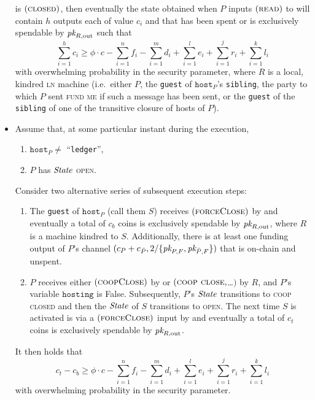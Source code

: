 \begin{lemma}
\begin{itemize}
    is $(\textsc{closed})$, then eventually the state obtained when $P$ inputs
    $(\textsc{read})$ to \ledger will contain $h$ outputs each of value $c_i$
    and that has been spent or is exclusively spendable by $\textit{pk}_{R,
    \mathrm{out}}$ such that
    \begin{equation}
    \label{lemma:real-balance-security:ineq}
      \sum\limits_{i=1}^h c_i \geq \phi \cdot c - \sum\limits_{i=1}^n f_i -
      \sum\limits_{i=1}^m d_i + \sum\limits_{i=1}^l e_i + \sum\limits_{i=1}^j
      r_i + \sum\limits_{i=1}^k l_i
    \end{equation}
    with overwhelming probability in the security parameter, where $R$ is a
    local, kindred \textsc{ln} machine (i.e.\ either $P$, the \texttt{guest} of
    $\texttt{host}_P$'s \texttt{sibling}, the party to which $P$ sent
    \textsc{fund me} if such a message has been sent, or the \texttt{guest} of
    the \texttt{sibling} of one of the transitive closure of hosts of $P$).
    \item Assume that, at some particular instant during the execution,
    \begin{enumerate}
      \item $\texttt{host}_P \neq$ ``\texttt{ledger}'',
      \item $P$ has $\itistate$ \textsc{open}.
    \end{enumerate}
    Consider two alternative series of subsequent execution steps:
    \begin{enumerate}
      \item The \texttt{guest} of $\texttt{host}_P$ (call them $S$) receives
      $(\textsc{forceClose})$ by \environment and eventually a total of $c_b$
      coins is exclusively spendable by $\textit{pk}_{R, \mathrm{out}}$, where $R$ is a
      machine kindred to $S$. Additionally, there is at least one funding output
      of $P$'s channel $(c_P + c_{\bar{P}}, 2/\{\textit{pk}_{P, F}, \textit{pk}_{\bar{P}, F}\})$
      that is on-chain and unspent.
      \item $P$ receives either $(\textsc{coopClose})$ by \environment or
      $(\textsc{coop close}, $\dots$)$ by $R$, and $P$'s variable
      $\texttt{hosting}$ is False. Subsequently, $P$'s $\itistate$ transitions
      to \textsc{coop closed} and then the $\itistate$ of $S$ transitions to
      \textsc{open}. The next time $S$ is activated is via a
      $(\textsc{forceClose})$ input by \environment and eventually a total of
      $c_t$ coins is exclusively spendable by $\textit{pk}_{R, \mathrm{out}}$.
    \end{enumerate}
    It then holds that
    \begin{equation}
      c_t - c_b \geq \phi \cdot c - \sum\limits_{i=1}^n f_i -
      \sum\limits_{i=1}^m d_i + \sum\limits_{i=1}^l e_i + \sum\limits_{i=1}^j
      r_i + \sum\limits_{i=1}^k l_i
    \end{equation}
    with overwhelming probability in the security parameter.
  \end{itemize}
\end{lemma}

